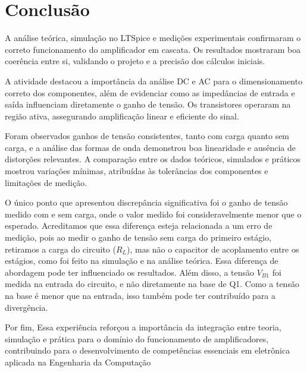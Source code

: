 \section{Conclusão}

A análise teórica, simulação no LTSpice e medições experimentais confirmaram o correto funcionamento do amplificador em cascata. Os resultados mostraram boa coerência entre si, validando o projeto e a precisão dos cálculos iniciais.

A atividade destacou a importância da análise DC e AC para o dimensionamento correto dos componentes, além de evidenciar como as impedâncias de entrada e saída influenciam diretamente o ganho de tensão. Os transistores operaram na região ativa, assegurando amplificação linear e eficiente do sinal.

Foram observados ganhos de tensão consistentes, tanto com carga quanto sem carga, e a análise das formas de onda demonstrou boa linearidade e ausência de distorções relevantes. A comparação entre os dados teóricos, simulados e práticos mostrou variações mínimas, atribuídas às tolerâncias dos componentes e limitações de medição. 

O único ponto que apresentou discrepância significativa foi o ganho de tensão medido com e sem carga, onde o valor medido foi consideravelmente menor que o esperado. Acreditamos que essa diferença esteja relacionada a um erro de medição, pois ao medir o ganho de tensão sem carga do primeiro estágio, retiramos a carga do circuito ($R_L$), mas não o capacitor de acoplamento entre os estágios, como foi feito na simulação e na análise teórica. Essa diferença de abordagem pode ter influenciado os resultados. Além disso, a tensão $V_{B1}$ foi medida na entrada do circuito, e não diretamente na base de Q1. Como a tensão na base é menor que na entrada, isso também pode ter contribuído para a divergência.

Por fim, Essa experiência reforçou a importância da integração entre teoria, simulação e prática para o domínio do funcionamento de amplificadores, contribuindo para o desenvolvimento de competências essenciais em eletrônica aplicada na Engenharia da Computação

\nocite{boylestad, malvino}
